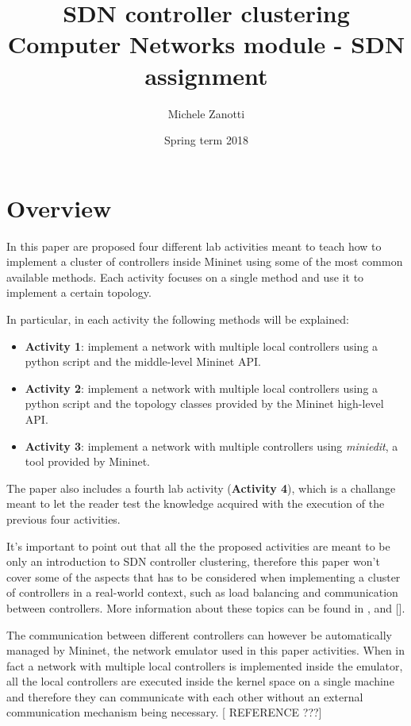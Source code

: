 \documentclass[12pt, a4paper]{article}
\title{SDN controller clustering \\ \large Computer Networks module - SDN assignment}
\author{Michele Zanotti}
\date{Spring term 2018}
\begin{document}
\maketitle
\newpage

\section*{Overview}
In this paper are proposed four different lab activities meant to teach how to implement
a cluster of controllers inside Mininet using some of the most common available methods.
Each activity focuses on a single method and use it to implement a certain topology.

In particular, in each activity the following methods will be explained:
\begin{itemize}
  \item \textbf{Activity 1}: implement a network with multiple local controllers using a python
  script and the middle-level Mininet API.
  \item \textbf{Activity 2}: implement a network with multiple local controllers using a python
  script and the topology classes provided by the Mininet high-level API.
  \item \textbf{Activity 3}: implement a network with multiple controllers using
  \emph{miniedit}, a tool provided by Mininet.
\end{itemize}

The paper also includes a fourth lab activity (\textbf{Activity 4}), which is a challange meant
to let the reader test the knowledge acquired with the execution of the previous
four activities.

It's important to point out that all the the proposed activities are meant to be
only an introduction to SDN controller clustering, therefore this paper won't cover
some of the aspects that has to be considered when implementing a cluster of
controllers in a real-world context, such as load balancing and communication
between controllers. More information about these topics can be found in
\cite{ref-1}, \cite{ref-2} and [].

The communication between different controllers can however be automatically managed
by Mininet, the network emulator used in this paper activities. When in fact a
network with multiple local controllers is implemented inside the emulator, all
the local controllers are executed inside the kernel space on a single machine
and therefore they can communicate with each other without an external
communication mechanism being necessary. [ REFERENCE ???]
\end{document}
